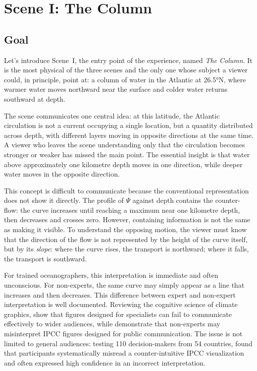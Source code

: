 \section{Scene I: The Column}
\label{sec:scene-column}

\subsection{Goal}
\label{subsec:column-objective}

Let's introduce Scene~I, the entry point of the experience, named \emph{The Column}. It is the most physical of the three scenes and the only one whose subject a viewer could, in principle, point at: a column of water in the Atlantic at 26.5°N, where warmer water moves northward near the surface and colder water returns southward at depth.

The scene communicates one central idea: at this latitude, the Atlantic circulation is not a current occupying a single location, but a quantity distributed across depth, with different layers moving in opposite directions at the same time. A viewer who leaves the scene understanding only that the circulation becomes stronger or weaker has missed the main point. The essential insight is that water above approximately one kilometre depth moves in one direction, while deeper water moves in the opposite direction.

This concept is difficult to communicate because the conventional representation does not show it directly. The profile of $\Psi$ against depth contains the counter-flow: the curve increases until reaching a maximum near one kilometre depth, then decreases and crosses zero. However, containing information is not the same as making it visible. To understand the opposing motion, the viewer must know that the direction of the flow is not represented by the height of the curve itself, but by its \emph{slope}: where the curve rises, the transport is northward; where it falls, the transport is southward.

For trained oceanographers, this interpretation is immediate and often unconscious. For non-experts, the same curve may simply appear as a line that increases and then decreases. This difference between expert and non-expert interpretation is well documented. Reviewing the cognitive science of climate graphics, \textcite{harold2016} show that figures designed for specialists can fail to communicate effectively to wider audiences, while \textcite{mcmahon2015} demonstrate that non-experts may misinterpret IPCC figures designed for public communication. The issue is not limited to general audiences: testing 110 decision-makers from 54 countries, \textcite{fischer2020} found that participants systematically misread a counter-intuitive IPCC visualization and often expressed high confidence in an incorrect interpretation.

